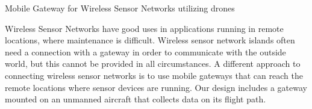 Mobile Gateway for Wireless Sensor Networks utilizing drones

Wireless Sensor Networks have good uses in applications running in remote
locations, where maintenance is difficult. Wireless sensor network islands often
need a connection with a gateway in order to communicate with the outside world,
but this cannot be provided in all circumstances. A different approach to
connecting wireless sensor networks is to use mobile gateways that can reach
the remote locations where sensor devices are running. Our design includes a gateway
mounted on an unmanned aircraft that collects data on its flight path.  
